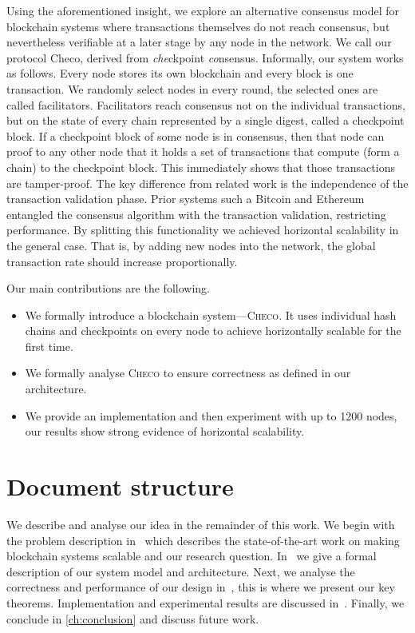 Using the aforementioned insight,
we explore an alternative consensus model for blockchain systems where transactions themselves do not reach consensus,
but nevertheless verifiable at a later stage by any node in the network.
We call our protocol \textsf{Checo}, derived from \emph{che}ckpoint \emph{co}nsensus.
Informally, our system works as follows.
Every node stores its own blockchain and every block is one transaction.
We randomly select nodes in every round, the selected ones are called facilitators.
Facilitators reach consensus not on the individual transactions,
but on the state of every chain represented by a single digest, called a checkpoint block.
If a checkpoint block of some node is in consensus, 
then that node can proof to any other node that it holds a set of transactions that compute (form a chain) to the checkpoint block.
This immediately shows that those transactions are tamper-proof.
The key difference from related work is the independence of the transaction validation phase.
Prior systems such a Bitcoin and Ethereum entangled the consensus algorithm with the transaction validation, restricting performance.
By splitting this functionality we achieved horizontal scalability in the general case.
That is, by adding new nodes into the network, the global transaction rate should increase proportionally.

Our main contributions are the following.
\begin{itemize}
    \item We formally introduce a blockchain system---\textsc{Checo}.
        It uses individual hash chains and checkpoints on every node to achieve
        horizontally scalable for the first time.
    \item We formally analyse \textsc{Checo} to ensure correctness as defined in our architecture.
    \item We provide an implementation and then experiment with up to 1200 nodes,
        our results show strong evidence of horizontal scalability.
\end{itemize}

\section{Document structure}
We describe and analyse our idea in the remainder of this work.
We begin with the problem description in~ which describes the state-of-the-art work on making blockchain systems scalable and our research question.
In~ we give a formal description of our system model and architecture.
Next, we analyse the correctness and performance of our design in~, this is where we present our key theorems.
Implementation and experimental results are discussed in~.
Finally, we conclude in \ref{ch:conclusion} and discuss future work.
